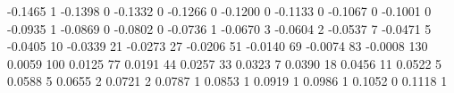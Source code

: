 -0.1465 1
-0.1398 0
-0.1332 0
-0.1266 0
-0.1200 0
-0.1133 0
-0.1067 0
-0.1001 0
-0.0935 1
-0.0869 0
-0.0802 0
-0.0736 1
-0.0670 3
-0.0604 2
-0.0537 7
-0.0471 5
-0.0405 10
-0.0339 21
-0.0273 27
-0.0206 51
-0.0140 69
-0.0074 83
-0.0008 130
0.0059 100
0.0125 77
0.0191 44
0.0257 33
0.0323 7
0.0390 18
0.0456 11
0.0522 5
0.0588 5
0.0655 2
0.0721 2
0.0787 1
0.0853 1
0.0919 1
0.0986 1
0.1052 0
0.1118 1
